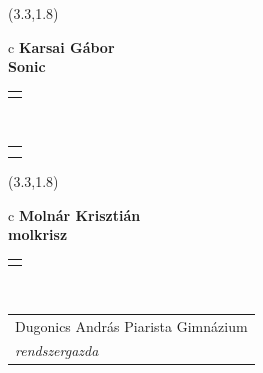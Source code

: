 \documentclass[11pt]{article}
\begin{document}
\makebox(3.3,1.8){
  \renewcommand\arraystretch{1.3}
  \begin{tabular}[c]{c}
    \hspace{8.5mm}
    \LARGE\bf{ Karsai Gábor }\\
    \hspace{8.5mm}
    \Large{ Sonic }\\
    \renewcommand\arraystretch{3}
    \begin{tabular}[c]{c}
      \centering
      \fontfamily{phv}\selectfont{
        \textbf{
          \textsc{
            \scriptsize{
            \color{Dark}{ Ismerkedő }\color{Bright}{ Webmester }\color{Bright}{ Sminkmester }\color{Bright}{ Programozó }
            }
          }
        }
      }
    \end{tabular}
    \\
    \renewcommand\arraystretch{1}
    \begin{tabular}{p{3.3in}}
      \hspace{.7cm}\\
      \hspace{.7cm}\emph{  }\\
    \end{tabular}
  \end{tabular}
}

\makebox(3.3,1.8){
  \renewcommand\arraystretch{1.3}
  \begin{tabular}[c]{c}
    \hspace{8.5mm}
    \LARGE\bf{ Molnár Krisztián }\\
    \hspace{8.5mm}
    \Large{ molkrisz }\\
    \renewcommand\arraystretch{3}
    \begin{tabular}[c]{c}
      \centering
      \fontfamily{phv}\selectfont{
        \textbf{
          \textsc{
            \scriptsize{
            \color{Bright}{ Ismerkedő }\color{Dark}{ Webmester }\color{Bright}{ Sminkmester }\color{Bright}{ Programozó }
            }
          }
        }
      }
    \end{tabular}
    \\
    \renewcommand\arraystretch{1}
    \begin{tabular}{p{3.3in}}
      \hspace{.7cm}Dugonics András Piarista Gimnázium\\
      \hspace{.7cm}\emph{ rendszergazda }\\
    \end{tabular}
  \end{tabular}
}
\end{document}

